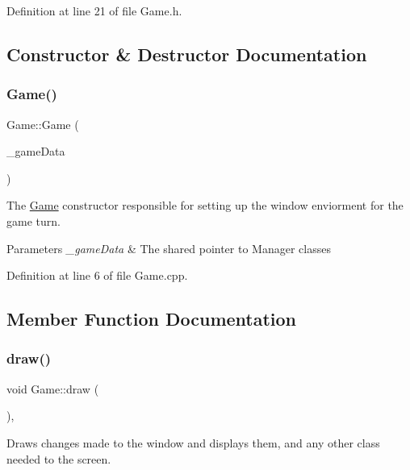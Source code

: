 Definition at line 21 of file Game.\+h.



\subsection{Constructor \& Destructor Documentation}
\mbox{\label{class_game_a57536075cd1bb2ffd645ff05bd1ff9b8}} 
\subsubsection{\texorpdfstring{Game()}{Game()}}
{\footnotesize\ttfamily Game\+::\+Game (\begin{DoxyParamCaption}\item[{\mbox{\hyperlink{_engine_8h_a5bbe002e9f7f45a67e8fda9dbe980a3f}{Game\+Data}}}]{\+\_\+game\+Data }\end{DoxyParamCaption})\hspace{0.3cm}{\ttfamily [explicit]}}

The \mbox{\hyperlink{class_game}{Game}} constructor responsible for setting up the window enviorment for the game turn. 
\begin{DoxyParams}{Parameters}
{\em \+\_\+game\+Data} & The shared pointer to Manager classes \\
\hline
\end{DoxyParams}


Definition at line 6 of file Game.\+cpp.



\subsection{Member Function Documentation}
\mbox{\label{class_game_a9dbbb6429980a91196ed07d299404304}} 
\subsubsection{\texorpdfstring{draw()}{draw()}}
{\footnotesize\ttfamily void Game\+::draw (\begin{DoxyParamCaption}{ }\end{DoxyParamCaption})\hspace{0.3cm}{\ttfamily [override]}, {\ttfamily [virtual]}}

Draws changes made to the window and displays them, and any other class needed to the screen. 


